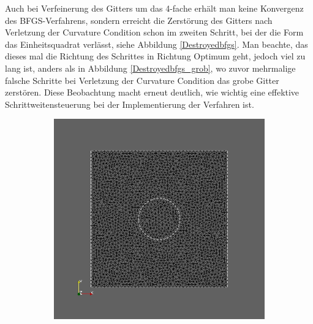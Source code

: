 Auch bei Verfeinerung des Gitters um das 4-fache erhält man keine Konvergenz des BFGS-Verfahrens, sondern erreicht die Zerstörung des Gitters nach Verletzung der Curvature Condition schon im zweiten Schritt, bei der die Form das Einheitsquadrat verlässt, siehe Abbildung \ref{Destroyedbfgs}. Man beachte, das dieses mal die Richtung des Schrittes in Richtung Optimum geht, jedoch viel zu lang ist, anders als in Abbildung \ref{Destroyedbfgs_grob}, wo zuvor mehrmalige falsche Schritte bei Verletzung der Curvature Condition das grobe Gitter zerstören. Diese Beobachtung macht erneut deutlich, wie wichtig eine effektive Schrittweitensteuerung bei der Implementierung der Verfahren ist.

\begin{figure}
	\begin{subfigure}{0.5\textwidth}
	\centering
	\includegraphics[scale=0.25]{pic_smallcircle_bfgsdestroyed1.jpg}
	\caption{}	
	\end{subfigure}
	\begin{subfigure}{0.5\textwidth}
	\centering

\end{subfigure}
\end{figure}
